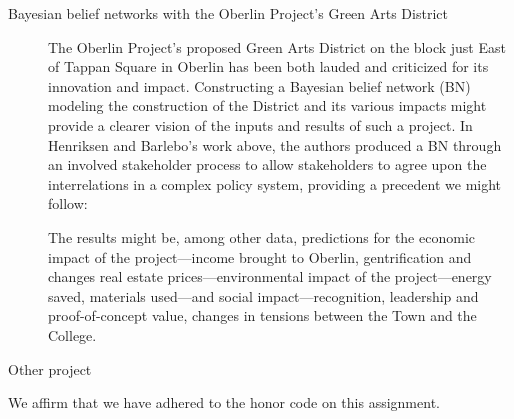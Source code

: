 \documentclass[11pt]{amsart}
\newcommand{\honor}{We affirm that we have adhered to the honor code on this assignment.}
\begin{document}
\begin{description}

\item[Bayesian belief networks with the Oberlin Project's Green Arts District]
The Oberlin Project's proposed Green Arts District on the block just East of Tappan Square in Oberlin has been both
lauded and criticized for its innovation and impact.  Constructing a Bayesian belief network (BN) modeling the
construction of the District and its various impacts might provide a clearer vision of the inputs and results of such a
project.  In Henriksen and Barlebo's work above, the authors produced a BN through an involved stakeholder process to
allow stakeholders to agree upon the interrelations in a complex policy system, providing a precedent we might follow:
\renewcommand{\theenumi}{(\roman{enumi})}
\renewcommand{\labelenumi}{\theenumi}
\renewcommand{\theenumi}{\alph{enumi}.}
\renewcommand{\labelenumi}{\theenumi}
The results might be, among other data, predictions for the economic impact of the project\----income brought to
Oberlin, gentrification and changes real estate prices\----environmental impact of the project\----energy saved,
materials used\----and social impact\----recognition, leadership and proof-of-concept value, changes in tensions between
the Town and the College.

\item[Other project]

\end{description}

\honor
\end{document}
